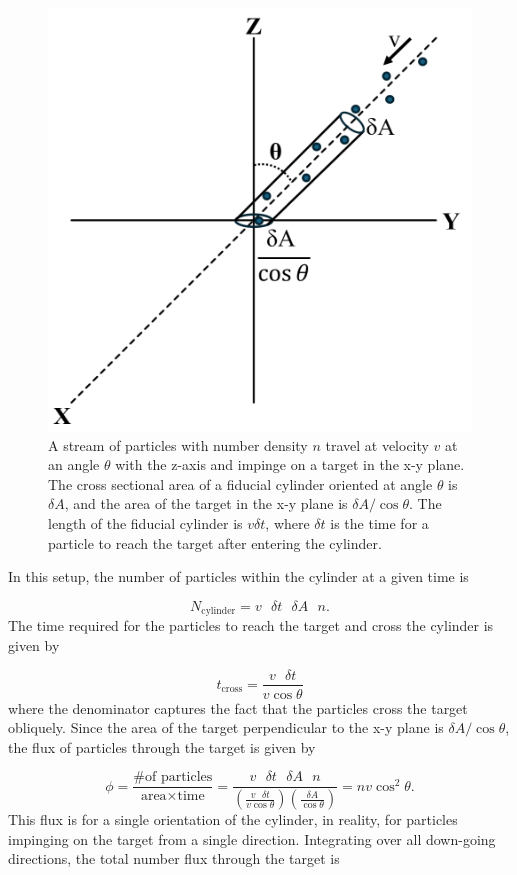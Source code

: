 \documentclass[12pt]{article}
\newcommand{\bigparenthesis}[1]{\left(#1\right)}
\begin{document}
\begin{figure}[H]
    \centering
    \includegraphics[width=0.5\linewidth]{Appendices//Rad Transport/diffusion.png}
    \caption{A stream of particles with number density $n$ travel at velocity $v$ at an angle $\theta$ with the z-axis and impinge on a target in the x-y plane. The cross sectional area of a fiducial cylinder oriented at angle $\theta$ is $\delta A$, and the area of the target in the x-y plane is $\delta A/\cos\theta$. The length of the fiducial cylinder is $v\delta t$, where $\delta t$ is the time for a particle to reach the target after entering the cylinder.}
    \label{fig:diff_diagram}
\end{figure}

In this setup, the number of particles within the cylinder at a given time is

\begin{equation}
   N_\mathrm{cylinder} = v \text{ } \delta t \text{ } \delta A \text{ } n.
\end{equation}
%
The time required for the particles to reach the target and cross the cylinder is given by

\begin{equation}
    t_\mathrm{cross} = \frac{v \text{ } \delta t}{v\cos\theta}
\end{equation}
%
where the denominator captures the fact that the particles cross the target obliquely. Since the area of the target perpendicular to the x-y plane is $\delta A/\cos\theta$, the flux of particles through the target is given by

\begin{equation}
    \phi = \frac{\text{\# of particles}}{\text{area}\times\text{time}} = \frac{v \text{ } \delta t \text{ } \delta A \text{ } n}{\bigparenthesis{\frac{v \text{ } \delta t}{v\cos\theta}} \bigparenthesis{\frac{\delta A}{\cos\theta}}} = n v \cos^2 \theta.
\end{equation}
%
This flux is for a single orientation of the cylinder, in reality, for particles impinging on the target from a single direction. Integrating over all down-going directions, the total number flux through the target is
\end{document}
